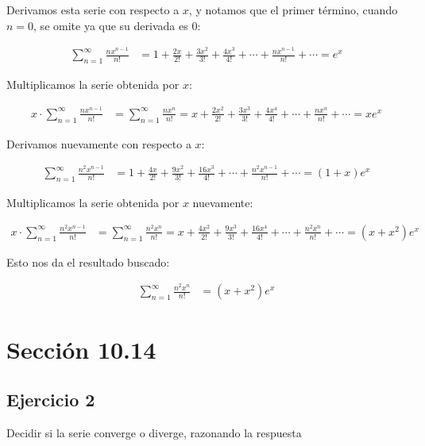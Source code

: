 \documentclass{article}
\begin{document}
    Derivamos esta serie con respecto a \( x \), y notamos que el primer término, cuando \( n=0 \), se omite ya que su derivada es 0:

    \begin{align*}
    \sum_{n=1}^{\infty} \frac{n x^{n-1}}{n!} &= 1 + \frac{2 x}{2!} + \frac{3 x^{2}}{3!} + \frac{4 x^{3}}{4!} + \cdots + \frac{n x^{n-1}}{n!} + \cdots = e^{x}
    \end{align*}

    Multiplicamos la serie obtenida por \( x \):

    \begin{align*}
    x \cdot \sum_{n=1}^{\infty} \frac{n x^{n-1}}{n!} &= \sum_{n=1}^{\infty} \frac{n x^{n}}{n!} = x + \frac{2 x^{2}}{2!} + \frac{3 x^{3}}{3!} + \frac{4 x^{4}}{4!} + \cdots + \frac{n x^{n}}{n!} + \cdots = x e^{x}
    \end{align*}

    Derivamos nuevamente con respecto a \( x \):

    \begin{align*}
    \sum_{n=1}^{\infty} \frac{n^{2} x^{n-1}}{n!} &= 1 + \frac{4 x}{2!} + \frac{9 x^{2}}{3!} + \frac{16 x^{3}}{4!} + \cdots + \frac{n^{2} x^{n-1}}{n!} + \cdots = (1 + x) e^{x}
    \end{align*}

    Multiplicamos la serie obtenida por \( x \) nuevamente:

    \begin{align*}
    x \cdot \sum_{n=1}^{\infty} \frac{n^{2} x^{n-1}}{n!} &= \sum_{n=1}^{\infty} \frac{n^{2} x^{n}}{n!} = x + \frac{4 x^{2}}{2!} + \frac{9 x^{3}}{3!} + \frac{16 x^{4}}{4!} + \cdots + \frac{n^{2} x^{n}}{n!} + \cdots = (x + x^{2}) e^{x}
    \end{align*}

    Esto nos da el resultado buscado:

    \begin{align*}
    \sum_{n=1}^{\infty} \frac{n^{2} x^{n}}{n!} &= (x + x^{2}) e^{x}
    \end{align*}
    \section*{Sección 10.14}
    \subsection*{Ejercicio 2}

    Decidir si la serie converge o diverge, razonando la respuesta
\end{document}
